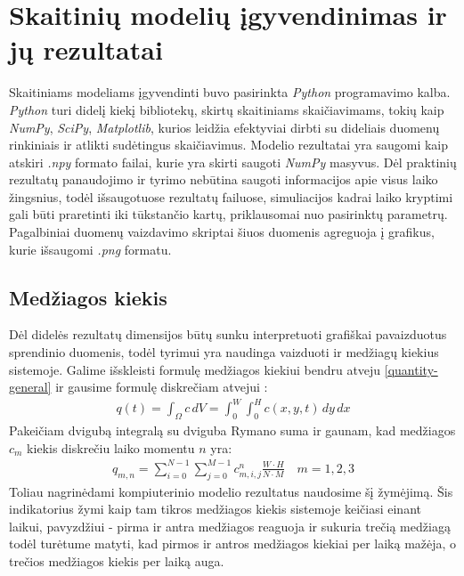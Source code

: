 \section{Skaitinių modelių įgyvendinimas ir jų rezultatai}
Skaitiniams modeliams įgyvendinti buvo pasirinkta \textit{Python} programavimo kalba. \textit{Python} turi didelį kiekį bibliotekų, skirtų skaitiniams skaičiavimams, tokių kaip \textit{NumPy}, \textit{SciPy}, \textit{Matplotlib}, kurios leidžia efektyviai dirbti su dideliais duomenų rinkiniais ir atlikti sudėtingus skaičiavimus. Modelio rezultatai yra saugomi kaip atskiri \textit{.npy} formato failai, kurie yra skirti saugoti \mbox{\textit{NumPy}} masyvus. Dėl praktinių rezultatų panaudojimo ir tyrimo nebūtina saugoti informacijos apie visus laiko žingsnius, todėl išsaugotuose rezultatų failuose, simuliacijos kadrai laiko kryptimi gali būti praretinti iki tūkstančio kartų, priklausomai nuo pasirinktų parametrų. Pagalbiniai duomenų vaizdavimo skriptai šiuos duomenis agreguoja į grafikus, kurie išsaugomi \textit{.png} formatu.
\subsection{Medžiagos kiekis}
Dėl didelės rezultatų dimensijos būtų sunku interpretuoti grafiškai pavaizduotus sprendinio duomenis, todėl tyrimui yra naudinga vaizduoti ir medžiagų kiekius sistemoje. Galime išskleisti formulę medžiagos kiekiui bendru atveju \eqref{quantity-general} ir gausime formulę diskrečiam atvejui \cite{strangCalculusVolume32016}:
\begin{align}
  q(t) = \int_\Omega c\,dV = \int_0^W \int_0^H c(x, y, t)\,dy\,dx
\end{align}
Pakeičiam dvigubą integralą su dviguba Rymano suma ir gaunam, kad medžiagos $c_m$ kiekis diskrečiu laiko momentu $n$ yra:
\begin{align}
  q_{m, n}= \sum_{i=0}^{N-1}\sum_{j=0}^{M-1} c_{m, i,j}^n \frac{W\cdot H}{N\cdot M} \quad m=1, 2, 3
\end{align}
Toliau nagrinėdami kompiuterinio modelio rezultatus naudosime šį žymėjimą. Šis indikatorius žymi kaip tam tikros medžiagos kiekis sistemoje keičiasi einant laikui, pavyzdžiui - pirma ir antra medžiagos reaguoja ir sukuria trečią medžiagą todėl turėtume matyti, kad pirmos ir antros medžiagos kiekiai per laiką mažėja, o trečios medžiagos kiekis per laiką auga.
